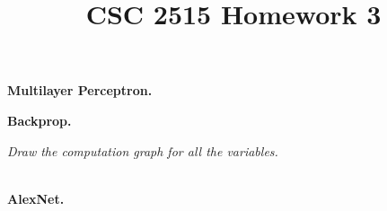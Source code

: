 \documentclass{myhw}
\title{CSC 2515 Homework 3}
\begin{document}
\begin{homeworkProblem}
\textbf{Multilayer Perceptron.} \\
\end{homeworkProblem}


\begin{homeworkProblem}
\textbf{Backprop.}
\begin{homeworkSection}
\emph{Draw the computation graph for all the variables.} \\
\\
\end{homeworkSection}
\begin{homeworkSection}
\end{homeworkSection}
\end{homeworkProblem}


\begin{homeworkProblem}
\textbf{AlexNet.}
\begin{homeworkSection}	
\end{homeworkSection}
\begin{homeworkSection}	
\end{homeworkSection}
\end{homeworkProblem}
\end{document}
